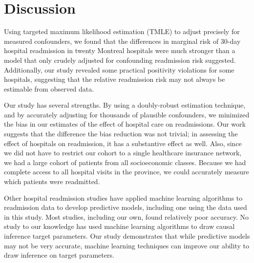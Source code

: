 \documentclass[]{article}\usepackage[]{graphicx}\usepackage[]{color}
\begin{document}
\section{Discussion}
Using targeted maximum likelihood estimation (TMLE) to adjust precisely for measured confounders, we found that the differences in marginal risk of 30-day hospital readmission in twenty Montreal hospitals were much stronger than a model that only crudely adjusted for confounding readmission risk suggested. Additionally, our study revealed some practical positivity violations for some hospitals, suggesting that the relative readmission risk may not always be estimable from observed data.

Our study has several strengths. By using a doubly-robust estimation technique, and by accurately adjusting for thousands of plausible confounders, we minimized the bias in our estimates of the effect of hospital care on readmissions. Our work suggests that the difference the bias reduction was not trivial; in assessing the effect of hospitals on readmission, it has a substantive effect as well. Also, since we did not have to restrict our cohort to a single healthcare insurance network, we had a large cohort of patients from all socioeconomic classes. Because we had complete access to all hospital visits in the province, we could accurately measure which patients were readmitted.

Other hospital readmission studies have applied machine learning algorithms to readmission data to develop predictive models, including one using the data used in this study.\supercite{hosseinzadeh_assessing_2013} Most studies, including our own, found relatively poor accuracy.  No study to our knowledge has used machine learning algorithms to draw causal inference target parameters. Our study demonstrates that while predictive models may not be very accurate, machine learning techniques can improve our ability to draw inference on target parameters.
\end{document}

